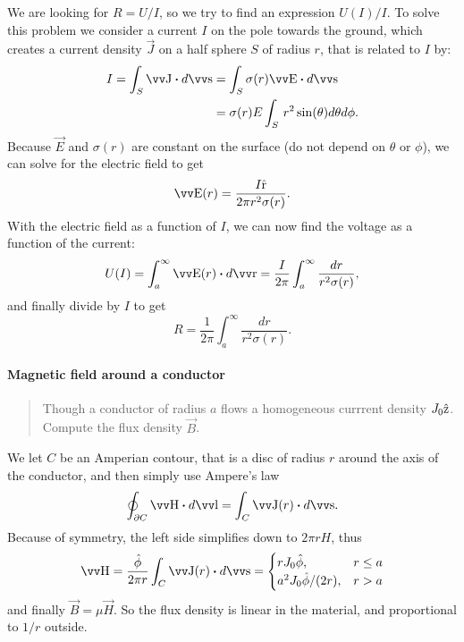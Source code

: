\documentclass[margin=small]{tex/hsrzf}
\theoremstyle{elmagzf}
\begin{document}
We are looking for \(R = U / I\), so we try to find an expression \(U(I)/I\). To
solve this problem we consider a current \(I\) on the pole towards the ground,
which creates a current density \(\vec{J}\) on a half sphere \(S\) of
radius \(r\), that is related to \(I\) by:
\begin{align*}
  I = \int_{S} \vec{J} \dotp d\vec{s}
  &= \int_{S} \sigma(r) \vec{E} \dotp d\vec{s} \\
  &= \sigma(r) E \int_{S} \, r^2 \sin(\theta) d\theta d\phi.
\end{align*}
Because \(\vec{E}\) and \(\sigma(r)\) are constant on the surface (do not depend
on \(\theta\) or \(\phi\)), we can solve for the electric field to get
\[
  \vec{E}(r) = \frac{I \uvec{r}}{2 \pi r^2 \sigma(r)}.
\]
With the electric field as a function of \(I\), we can now find the voltage as a
function of the current:
\[
  U(I) = \int_a^\infty \vec{E}(r) \dotp d\vec{r}
       = \frac{I}{2\pi} \int_a^\infty \frac{dr}{r^2 \sigma(r)},
\]
and finally divide by \(I\) to get
\begin{equation}
  R = \frac{1}{2\pi} \int_a^\infty \frac{dr}{r^2 \sigma(r)}.
\end{equation}

\paragraph{Magnetic field around a conductor}
\begin{quote}
  Though a conductor of radius \(a\) flows a homogeneous currrent density
  \(J_0\hat{\mathrm{z}}\). Compute the flux density \(\vec{B}\).
\end{quote}

We let \(C\) be an Amperian contour, that is a disc of radius \(r\) around the
axis of the conductor, and then simply use Ampere's law 
\[
  \oint_{\partial C} \vec{H} \dotp d\vec{l} = \int_C \vec{J}(r) \dotp d\vec{s}.
\]
Because of symmetry, the left side simplifies down to \(2\pi r H\), thus
\[
  \vec{H} = \frac{\uvec{\phi}}{2\pi r} \int_C \vec{J}(r) \dotp d\vec{s} =
    \begin{cases}
      r J_0 \uvec{\phi}, & r \leq a \\
      a^2 J_0 \uvec{\phi} / (2r) , & r > a \\
    \end{cases}
\]
and finally \(\vec{B} = \mu \vec{H}\). So the flux density is linear in the
material, and proportional to \(1/r\) outside.
\end{document}
